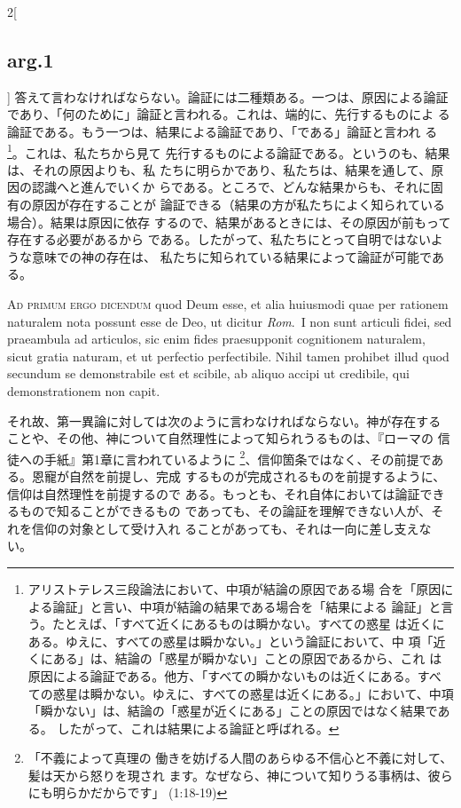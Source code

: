 \documentclass[paper=a4paper,fontsize=10pt,jafontsize=9pt,titlepage]{jlreq}
\begin{document}
\begin{paracol}{2}[\subsection{arg.1}]
答えて言わなければならない。論証には二種類ある。一つは、原因による論証
であり、「何のために」論証と言われる。これは、端的に、先行するものによ
る論証である。もう一つは、結果による論証であり、「である」論証と言われ
る\footnote {アリストテレス三段論法において、中項が結論の原因である場
合を「原因による論証」と言い、中項が結論の結果である場合を「結果による
論証」と言う。たとえば、「すべて近くにあるものは瞬かない。すべての惑星
は近くにある。ゆえに、すべての惑星は瞬かない。」という論証において、中
項「近くにある」は、結論の「惑星が瞬かない」ことの原因であるから、これ
は原因による論証である。他方、「すべての瞬かないものは近くにある。すべ
ての惑星は瞬かない。ゆえに、すべての惑星は近くにある。」において、中項
「瞬かない」は、結論の「惑星が近くにある」ことの原因ではなく結果である。
したがって、これは結果による論証と呼ばれる。}。これは、私たちから見て
先行するものによる論証である。というのも、結果は、それの原因よりも、私
たちに明らかであり、私たちは、結果を通して、原因の認識へと進んでいくか
らである。ところで、どんな結果からも、それに固有の原因が存在することが
論証できる（結果の方が私たちによく知られている場合）。結果は原因に依存
するので、結果があるときには、その原因が前もって存在する必要があるから
である。したがって、私たちにとって自明ではないような意味での神の存在は、
私たちに知られている結果によって論証が可能である。

\switchcolumn*[\subsection{ad.1}]

{\scshape Ad primum ergo dicendum} quod Deum esse, et alia huiusmodi quae
per rationem naturalem nota possunt esse de Deo, ut dicitur {\itshape
Rom}.~I non sunt articuli fidei, sed praeambula ad articulos, sic enim
fides praesupponit cognitionem naturalem, sicut gratia naturam, et ut
perfectio perfectibile. Nihil tamen prohibet illud quod secundum se
demonstrabile est et scibile, ab aliquo accipi ut credibile, qui
demonstrationem non capit.

\switchcolumn

それ故、第一異論に対しては次のように言わなければならない。神が存在する
ことや、その他、神について自然理性によって知られうるものは、『ローマの
信徒への手紙』第1章に言われているように \footnote{「不義によって真理の
働きを妨げる人間のあらゆる不信心と不義に対して、髪は天から怒りを現され
ます。なぜなら、神について知りうる事柄は、彼らにも明らかだからです」
(1:18-19)}、信仰箇条ではなく、その前提である。恩寵が自然を前提し、完成
するものが完成されるものを前提するように、信仰は自然理性を前提するので
ある。もっとも、それ自体においては論証できるもので知ることができるもの
であっても、その論証を理解できない人が、それを信仰の対象として受け入れ
ることがあっても、それは一向に差し支えない。


\end{paracol}
\end{document}
